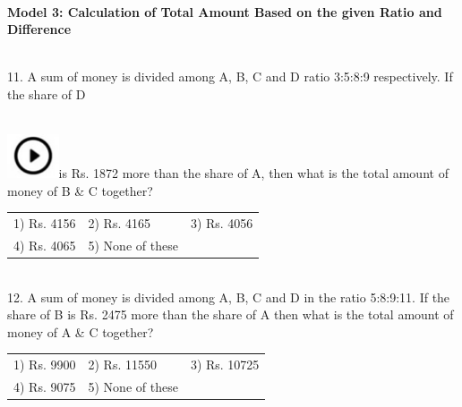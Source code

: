 \documentclass{article}
\begin{document}
	\noindent 
	
	\noindent 
	
	\noindent 
	
	\noindent \\   \textbf{Model 3: Calculation of Total Amount Based on the given Ratio and Difference}
	
	\noindent 
	
	\noindent 
	
	\noindent  \\  11. A sum of money is divided among A, B, C and D ratio 3:5:8:9 respectively. If the share of D
	
	\noindent  
	\noindent \\ \includegraphics*[width=0.60in, height=0.52in]{images/image1}is Rs. 1872 more than the share of A, then what is the total amount of money of B \& C together?
	
	\noindent 
	
	\noindent \begin{tabular}{p{1.7in} p{1.6in} p{1.6in}} \\ 
 1) Rs. 4156                 &  2) Rs. 4165          &  3) Rs. 4056          \\
4) Rs. 4065          & 5) None of these  \\
\end{tabular}
	
	\noindent 
	
	\noindent 
	
	\noindent 
	
	\noindent \\   12. A sum of money is divided among A, B, C and D in the ratio 5:8:9:11. If the share of B is Rs. 2475 more than the share of A then what is the total amount of money of A \& C together?
	
	\noindent 
	
	\noindent \begin{tabular}{p{1.7in} p{1.6in} p{1.6in}} \\ 
 1) Rs. 9900                 &  2) Rs. 11550        &  3) Rs. 10725        \\
4) Rs. 9075          & 5) None of these  \\
\end{tabular}
	
	\noindent 
	
	\noindent 
	
\end{document}
